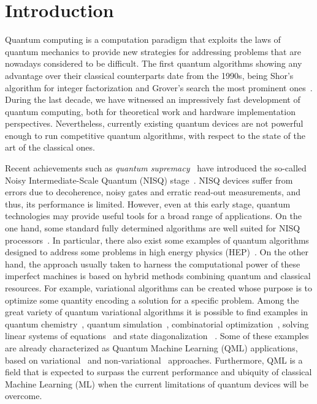 \documentclass[twocolumn,preprintnumbers,superscriptaddress]{revtex4-2}
\begin{document}
\section{Introduction}

Quantum computing is a computation paradigm that exploits the laws of quantum
mechanics to provide new strategies for addressing problems that are nowadays
considered to be difficult. The first quantum algorithms showing any advantage
over their classical counterparts date from the 1990s, being Shor's algorithm
for integer factorization and Grover's search the most prominent
ones~\cite{shor,grover}. During the last decade, we have witnessed an
impressively fast development of quantum computing, both for theoretical work
and hardware implementation perspectives. Nevertheless, currently existing
quantum devices are not powerful enough to run competitive quantum algorithms,
with respect to the state of the art of the classical ones.

Recent achievements such as {\sl quantum supremacy}~\cite{supremacy} have
introduced the so-called Noisy Intermediate-Scale Quantum (NISQ)
stage~\cite{nisq}. NISQ devices suffer from errors due to decoherence, noisy
gates and erratic read-out measurements, and thus, its performance is limited.
However, even at this early stage, quantum technologies may provide useful tools
for a broad range of applications. On the one hand, some standard fully
determined algorithms are well suited for NISQ
processors~\cite{cerveralierta:2018ising,suba:2019spectroscopy,bravyi:2018shallow,Bravyi:2020noisyshallow,ramoscalderer:2020unary}.
In particular, there also exist some examples of quantum algorithms designed to
address some problems in high energy physics
(HEP)~\cite{Perez-Salinas:2020nem,hep_amplitudes-bepari2020, hep_simulation-bauer2019,
hep_gluon-alexandru2019, hep_parton-lamm2020}. On the other hand, the approach
usually taken to harness the computational power of these imperfect machines is
based on hybrid methods combining quantum and classical resources. For example,
variational algorithms can be created whose purpose is to optimize some quantity
encoding a solution for a specific problem. Among the great variety of quantum
variational algorithms it is possible to find examples in quantum
chemistry~\cite{peruzzo:2014vqe,higgott:2019vqe,aspuru:2005molecular,hempel:2018chemistry,jones:2019vqe},
quantum
simulation~\cite{li:2017simulation,kokail:2019simulation,cirstoiu:2020simulation},
combinatorial optimization~\cite{farhi:2014qoao}, solving linear systems of
equations~\cite{bravoprieto:2020linear,xu:2019linear,huang:2019linear} and state
diagonalization
~\cite{LaRose:2019diagonalization,BravoPrieto:2020diagonalization}. Some of
these examples are already characterized as Quantum Machine Learning (QML)
applications, based on variational~\cite{perezsalinas:2020reuploading,P_rez_Salinas_2021,
mitarai:2018circuit,Zhu:2019circuit,Schuld:2020circuit,lloyd:2020embeddings} and
non-variational~\cite{liu:2020svm,Rebentrost:2014svm,lloyd:2013ml} approaches.
Furthermore, QML is a field that is expected to surpass the current performance
and ubiquity of classical Machine Learning (ML) when the current limitations of
quantum devices will be overcome.
\end{document}
